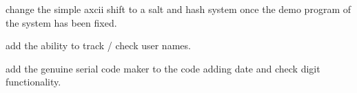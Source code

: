 
\begin{DoxyRefList}
\item[\label{todo__todo000003}%
\Hypertarget{todo__todo000003}%
Member \mbox{\hyperlink{main_8cpp_a48cfa0d90c8f02dabe1a7f895dc7afe8}{encrypt\+\_\+string}} (std\+::string old\+\_\+pass)]change the simple axcii shift to a salt and hash system once the demo program of the system has been fixed. 
\item[\label{todo__todo000001}%
\Hypertarget{todo__todo000001}%
Member \mbox{\hyperlink{main_8cpp_a91515845ed84b6ca72f6495e97e17d0a}{login\+\_\+menu}} ()]add the ability to track / check user names.  
\item[\label{todo__todo000002}%
\Hypertarget{todo__todo000002}%
Member \mbox{\hyperlink{main_8cpp_a1497eac5042b8781edbeee9da1e49385}{produce\+\_\+item}} (const std\+::vector$<$ Products $>$ \&product\+\_\+line, std\+::vector$<$ Production $>$ \&production\+\_\+line)]add the genuine serial code maker to the code adding date and check digit functionality. 
\end{DoxyRefList}